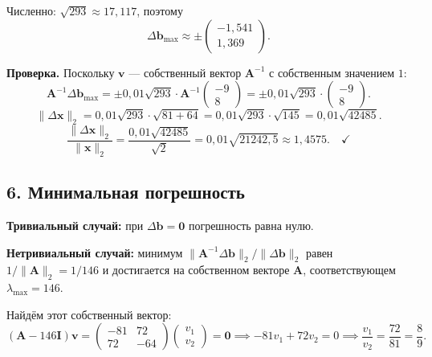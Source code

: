 \documentclass{article}
\begin{document}
Численно: $\sqrt{293} \approx 17{,}117$, поэтому
\begin{equation}
\Delta\mathbf{b}_{\max} \approx \pm \begin{pmatrix} -1{,}541 \\ 1{,}369 \end{pmatrix}.
\end{equation}

\textbf{Проверка.} Поскольку $\mathbf{v}$ --- собственный вектор $\mathbf{A}^{-1}$ с собственным значением $1$:
\begin{equation}
\mathbf{A}^{-1}\Delta\mathbf{b}_{\max} = \pm 0{,}01\sqrt{293} \cdot \mathbf{A}^{-1}\begin{pmatrix} -9 \\ 8 \end{pmatrix} = \pm 0{,}01\sqrt{293} \cdot \begin{pmatrix} -9 \\ 8 \end{pmatrix}.
\end{equation}
\begin{equation}
\|\Delta\mathbf{x}\|_2 = 0{,}01\sqrt{293} \cdot \sqrt{81 + 64} = 0{,}01\sqrt{293} \cdot \sqrt{145} = 0{,}01\sqrt{42485}.
\end{equation}
\begin{equation}
\frac{\|\Delta\mathbf{x}\|_2}{\|\mathbf{x}\|_2} = \frac{0{,}01\sqrt{42485}}{\sqrt{2}} = 0{,}01\sqrt{21242{,}5} \approx 1{,}4575. \quad \checkmark
\end{equation}

\subsection*{6. Минимальная погрешность}

\textbf{Тривиальный случай:} при $\Delta\mathbf{b} = \mathbf{0}$ погрешность равна нулю.

\textbf{Нетривиальный случай:} минимум $\|\mathbf{A}^{-1}\Delta\mathbf{b}\|_2/\|\Delta\mathbf{b}\|_2$ равен $1/\|\mathbf{A}\|_2 = 1/146$ и достигается на собственном векторе $\mathbf{A}$, соответствующем $\lambda_{\max} = 146$.

Найдём этот собственный вектор:
\begin{equation}
(\mathbf{A} - 146\mathbf{I})\mathbf{v} = \begin{pmatrix} -81 & 72 \\ 72 & -64 \end{pmatrix} \begin{pmatrix} v_1 \\ v_2 \end{pmatrix} = \mathbf{0} \implies -81v_1 + 72v_2 = 0 \implies \frac{v_1}{v_2} = \frac{72}{81} = \frac{8}{9}.
\end{equation}
\end{document}
